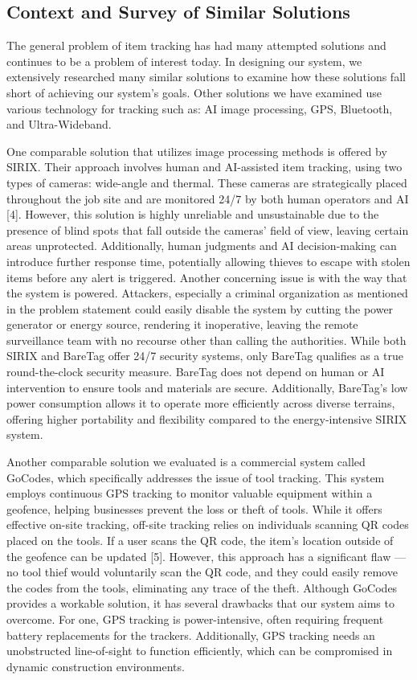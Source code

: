 \documentclass[conference]{IEEEtran}
\begin{document}
\subsection{Context and Survey of Similar Solutions}

The general problem of item tracking has had many attempted solutions 
and continues to be a problem of interest today. In designing our system, 
we extensively researched many similar solutions to examine how these 
solutions fall short of achieving our system’s goals. Other solutions 
we have examined use various technology for tracking such as: AI image 
processing, GPS, Bluetooth, and Ultra-Wideband.

One comparable solution that utilizes image processing methods is offered 
by SIRIX. Their approach involves human and AI-assisted item tracking, 
using two types of cameras: wide-angle and thermal. These cameras are 
strategically placed throughout the job site and are monitored 24/7 by both
human operators and AI [4]. However, this solution is highly unreliable 
and unsustainable due to the presence of blind spots that fall outside 
the cameras' field of view, leaving certain areas unprotected. 
Additionally, human judgments and AI decision-making can introduce 
further response time, potentially allowing thieves to escape with 
stolen items before any alert is triggered. Another concerning issue 
is with the way that the system is powered. Attackers, especially a 
criminal organization as mentioned in the problem statement could easily 
disable the system by cutting the power generator or energy source, 
rendering it inoperative, leaving the remote surveillance team with no 
recourse other than calling the authorities. While both SIRIX and 
BareTag offer 24/7 security systems, only BareTag qualifies as a 
true round-the-clock security measure. BareTag does not depend on 
human or AI intervention to ensure tools and materials are secure. 
Additionally, BareTag's low power consumption allows it to operate 
more efficiently across diverse terrains, offering higher portability 
and flexibility compared to the energy-intensive SIRIX system.

Another comparable solution we evaluated is a commercial system called 
GoCodes, which specifically addresses the issue of tool tracking. This 
system employs continuous GPS tracking to monitor valuable equipment 
within a geofence, helping businesses prevent the loss or theft of tools. 
While it offers effective on-site tracking, off-site tracking relies on 
individuals scanning QR codes placed on the tools. If a user scans the 
QR code, the item's location outside of the geofence can be updated [5]. 
However, this approach has a significant flaw — no tool thief would 
voluntarily scan the QR code, and they could easily remove the codes 
from the tools, eliminating any trace of the theft. Although GoCodes 
provides a workable solution, it has several drawbacks that our system 
aims to overcome. For one, GPS tracking is power-intensive, often requiring
frequent battery replacements for the trackers. Additionally, GPS 
tracking needs an unobstructed line-of-sight to function efficiently, 
which can be compromised in dynamic construction environments. 
\end{document}
